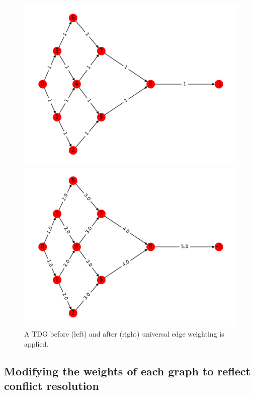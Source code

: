 \begin{figure}[H]
  \begin{minipage}[c]{0.5\textwidth}
    \centering
    \includegraphics[scale=0.5]{../../figures/G_pre_universal.pdf}
  \end{minipage}
  \begin{minipage}[c]{0.5\textwidth}
    \centering
    \includegraphics[scale=0.5]{../../figures/G_universal.pdf}
  \end{minipage}
  \caption{A TDG before (left) and after (right) universal edge weighting is applied.}
   \label{universal}
\end{figure}

\subsection{Modifying the weights of each graph to reflect conflict resolution}\label{sec:conflict}


